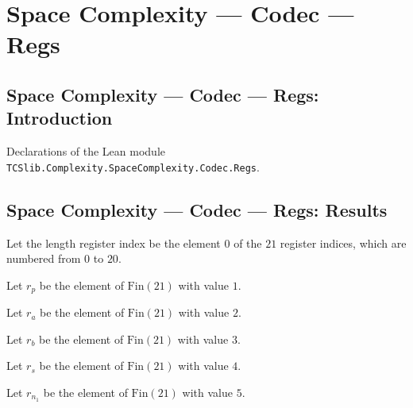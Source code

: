 \section{Space Complexity --- Codec --- Regs}
\subsection*{Space Complexity --- Codec --- Regs: Introduction}

Declarations of the Lean module \texttt{TCSlib.Complexity.SpaceComplexity.Codec.Regs}.

\subsection*{Space Complexity --- Codec --- Regs: Results}

\begin{definition}
\label{Complexity.Codec.rL}
\leanok
Let the length register index be the element $0$ of the $21$ register indices, which are
numbered from $0$ to $20$.
\end{definition}

\begin{definition}
\label{Complexity.Codec.rP}
\leanok
Let $r_p$ be the element of $\mathrm{Fin}(21)$ with value $1$.
\end{definition}

\begin{definition}
\label{Complexity.Codec.rA}
\leanok
Let $r_a$ be the element of $\mathrm{Fin}(21)$ with value $2$.
\end{definition}

\begin{definition}
\label{Complexity.Codec.rB}
\leanok
Let $r_b$ be the element of $\mathrm{Fin}(21)$ with value $3$.
\end{definition}

\begin{definition}
\label{Complexity.Codec.rS}
\leanok
Let $r_s$ be the element of $\mathrm{Fin}(21)$ with value $4$.
\end{definition}

\begin{definition}
\label{Complexity.Codec.rN1}
\leanok
Let $r_{n_1}$ be the element of $\mathrm{Fin}(21)$ with value $5$.
\end{definition}

